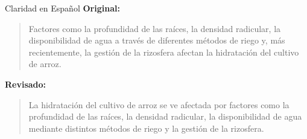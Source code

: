 \begin{frame}{Claridad en Español}
  \textbf{Original:}
  \begin{quote}
    Factores como la profundidad de las raíces, la densidad radicular, la disponibilidad de agua a través de diferentes métodos de riego y, más recientemente, la gestión de la rizosfera afectan la hidratación del cultivo de arroz.
  \end{quote} \pause
  \vspace{0.3cm}
  \textbf{\textcolor{primary}{Revisado:}}
  \begin{quote}
    La hidratación del cultivo de arroz se ve afectada por factores como la profundidad de las raíces, la densidad radicular, la disponibilidad de agua mediante distintos métodos de riego y la gestión de la rizosfera.
  \end{quote}
\end{frame}

